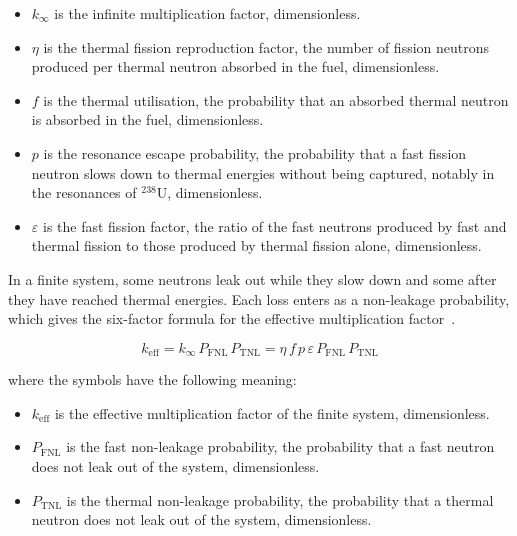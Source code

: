 \begin{itemize}
  \item $k_\infty$ is the infinite multiplication factor, dimensionless.

  \item $\eta$ is the thermal fission reproduction factor, the number of
        fission neutrons produced per thermal neutron absorbed in the
        fuel, dimensionless.

  \item $f$ is the thermal utilisation, the probability that an absorbed
        thermal neutron is absorbed in the fuel, dimensionless.

  \item $p$ is the resonance escape probability, the probability that a
        fast fission neutron slows down to thermal energies without being
        captured, notably in the resonances of $^{238}$U, dimensionless.

  \item $\varepsilon$ is the fast fission factor, the ratio of the fast
        neutrons produced by fast and thermal fission to those produced
        by thermal fission alone, dimensionless.
\end{itemize}

In a finite system, some neutrons leak out while they slow down and some
after they have reached thermal energies. Each loss enters as a
non-leakage probability, which gives the six-factor formula for the
effective multiplication factor~\cite{duderstadt_hamilton_1976}.

\begin{equation}
k_\mathrm{eff} = k_\infty\, P_\mathrm{FNL}\, P_\mathrm{TNL}
= \eta\, f\, p\, \varepsilon\, P_\mathrm{FNL}\, P_\mathrm{TNL}
\label{eq:keff}
\end{equation}

\noindent where the symbols have the following meaning:

\begin{itemize}
  \item $k_\mathrm{eff}$ is the effective multiplication factor of the
        finite system, dimensionless.

  \item $P_\mathrm{FNL}$ is the fast non-leakage probability, the
        probability that a fast neutron does not leak out of the system,
        dimensionless.

  \item $P_\mathrm{TNL}$ is the thermal non-leakage probability, the
        probability that a thermal neutron does not leak out of the
        system, dimensionless.
\end{itemize}

